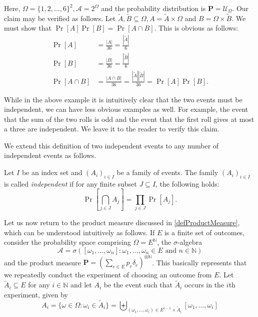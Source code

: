 Here, $\Omega=\{1,2,\ldots,6\}^2, \mathcal{A}=2^\Omega$ and the probability distribution is $\textbf{P}=\mathcal{U}_\Omega$. Our claim may be verified as follows. Let $\tilde A,\tilde B\subseteq\Omega, A=\tilde A\times\Omega$ and $B=\Omega\times\tilde B$. We must show that $\Pr[A]\Pr[B]=\Pr[A\cap B]$. This is obvious as follows:
\begin{align*}
    \Pr[A] &= \frac{|A|}{36}=\frac{|\tilde A|}{6} \\
    \Pr[B] &= \frac{|B|}{36}=\frac{|\tilde B|}{6} \\
    \Pr[A\cap B] &= \frac{|A\cap B|}{36} = \frac{|\tilde A||\tilde B|}{36} = \Pr[A]\Pr[B].
\end{align*}

While in the above example it is intuitively clear that the two events must be independent, we can have less obvious examples as well. For example, the event that the sum of the two rolls is odd and the event that the first roll gives at most a three are independent. We leave it to the reader to verify this claim.

\vspace{2mm}
We extend this definition of two independent events to any number of independent events as follows.

\begin{definition}
    Let $I$ be an index set and $(A_i)_{i\in I}$ be a family of events. The family $(A_i)_{i\in I}$ is called \textit{independent} if for any finite subset $J\subseteq I$, the following holds:
    $$\Pr\left[\bigcap_{j\in J}A_j\right]=\prod_{j\in J}\Pr[A_j].$$
\end{definition}

Let us now return to the product measure discussed in \ref{defProductMeasure}, which can be understood intuitively as follows. If $E$ is a finite set of outcomes, consider the probability space comprising $\Omega=E^\mathbb{N}$, the $\sigma$-algebra
$$\mathcal{A}=\sigma([\omega_1,\ldots,\omega_n]:\omega_1,\ldots,\omega_n\in E\text{ and }n\in\mathbb{N})$$
and the product measure $\textbf{P}=\left(\sum_{e\in E}p_e\delta_e\right)^{\otimes\mathbb{N}}$. This basically represents that we repeatedly conduct the experiment of choosing an outcome from $E$. Let $\tilde A_i\subseteq E$ for any $i\in\mathbb{N}$ and let $A_i$ be the event such that $\tilde A_i$ occurs in the $i$th experiment, given by
$$A_i = \{\omega\in\Omega:\omega_i\in\tilde A_i\}
  =\biguplus_{(\omega_1,\ldots,\omega_i)\in E^{i-1}\times \tilde A_i} [\omega_1,\ldots,\omega_i]$$

